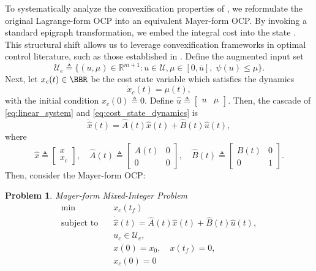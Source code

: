 \documentclass[conf]{new-aiaa}
\newtheorem{problem}{Problem}
\begin{document}
To systematically analyze the convexification properties of , we reformulate the original Lagrange-form OCP into an equivalent Mayer-form OCP. By invoking a standard epigraph transformation, we embed the integral cost into the state \cite{boyd_convex_2023}. This structural shift allows us to leverage convexification frameworks in optimal control literature, such as those established in \cite{harris_optimal_2021}. Define the augmented input set
%
\begin{equation*}
    \mathcal{U}_e \triangleq \{(u,\mu) \in \mathbb{R}^{m+1} : u \in \mathcal{U}, \mu \in [0, \bar{u}],\; \psi(u) \leq \mu\}.
\end{equation*}
%
Next, let $x_c(t) \in \BBR$ be the cost state variable which satisfies the dynamics
%
\begin{equation}\label{eq:cost_state_dynamics}
    \dot{x}_c(t) = \mu(t),
\end{equation}
%
with the initial condition $x_c(0) \triangleq 0$. Define $\hat{u} \triangleq \begin{bmatrix} u & \mu \end{bmatrix}$. Then, the cascade of \cref{eq:linear_system} and \cref{eq:cost_state_dynamics} is
%
\begin{equation} \label{eq:augmented_dynamics}
    \dot{\hat{x}}(t) = \hat{A}(t) \hat{x}(t) + \hat{B}(t)\hat{u}(t),
\end{equation}
%
where
%
\begin{equation*}
    \hat{x} \triangleq \begin{bmatrix} x \\ x_c \end{bmatrix}, \quad
    \hat{A}(t) \triangleq \begin{bmatrix}
        A(t) & 0 \\
        0 & 0
    \end{bmatrix}, \quad \hat{B}(t) \triangleq \begin{bmatrix}
        B(t) & 0 \\
        0 & 1
    \end{bmatrix}.
\end{equation*}
%
Then, consider the Mayer-form OCP:
%
\begin{problem}\rm{Mayer-form Mixed-Integer Problem}\label{prob:MICP_Mayer}
    \begin{subequations}
        \begin{align}
            \min \quad & x_c(t_f) \label{eq:TerminalCost}\\
            \text{subject to} \quad 
            & \dot{\hat{x}}(t) = \hat{A}(t) \hat{x}(t) + \hat{B}(t)\hat{u}(t),\\
            & u_c \in {\mathcal{U}}_e, \label{eq:input_cons}\\
            & x(0) = x_0, \quad x(t_f) = 0, \\
            & x_c(0) = 0
        \end{align}
    \end{subequations}
\end{problem}
%
\end{document}
